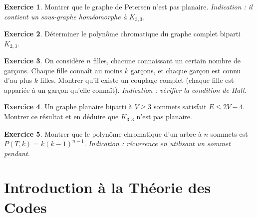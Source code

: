 \documentclass[12pt,a4paper,openany]{book}
\theoremstyle{definition}
\newtheorem{exercice}{Exercice}[chapter]
\theoremstyle{plain}
\theoremstyle{remark}
\begin{document}
\begin{exercice}
Montrer que le graphe de Petersen n'est pas planaire.
\textit{Indication : il contient un sous-graphe homéomorphe à $K_{3,3}$.}
\end{exercice}

\begin{exercice}
Déterminer le polynôme chromatique du graphe complet biparti $K_{2,3}$.
\end{exercice}

\begin{exercice}
On considère $n$ filles, chacune connaissant un certain nombre de garçons.
Chaque fille connaît au moins $k$ garçons, et chaque garçon est connu
d'au plus $k$ filles. Montrer qu'il existe un couplage complet (chaque
fille est appariée à un garçon qu'elle connaît).
\textit{Indication : vérifier la condition de Hall.}
\end{exercice}

\begin{exercice}
Un graphe planaire biparti à $V \geq 3$ sommets satisfait $E \leq 2V - 4$.
Montrer ce résultat et en déduire que $K_{3,3}$ n'est pas planaire.
\end{exercice}

\begin{exercice}
Montrer que le polynôme chromatique d'un arbre à $n$ sommets est
$P(T, k) = k(k-1)^{n-1}$.
\textit{Indication : récurrence en utilisant un sommet pendant.}
\end{exercice}

\bigskip
\begin{center}
\end{center}


\chapter{Introduction à la Théorie des Codes}
\label{ch:codes}
\end{document}
